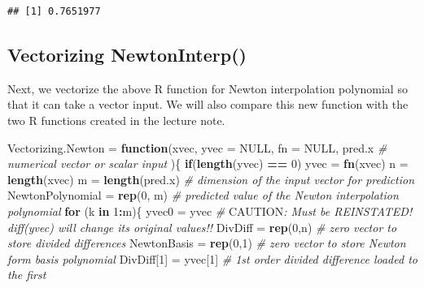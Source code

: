\documentclass[
]{book}
\newenvironment{Shaded}{\begin{snugshade}}{\end{snugshade}}
\newcommand{\AlertTok}[1]{\textcolor[rgb]{0.94,0.16,0.16}{#1}}
\newcommand{\AttributeTok}[1]{\textcolor[rgb]{0.13,0.29,0.53}{#1}}
\newcommand{\CommentTok}[1]{\textcolor[rgb]{0.56,0.35,0.01}{\textit{#1}}}
\newcommand{\ConstantTok}[1]{\textcolor[rgb]{0.56,0.35,0.01}{#1}}
\newcommand{\ControlFlowTok}[1]{\textcolor[rgb]{0.13,0.29,0.53}{\textbf{#1}}}
\newcommand{\DecValTok}[1]{\textcolor[rgb]{0.00,0.00,0.81}{#1}}
\newcommand{\FunctionTok}[1]{\textcolor[rgb]{0.13,0.29,0.53}{\textbf{#1}}}
\newcommand{\NormalTok}[1]{#1}
\newcommand{\OtherTok}[1]{\textcolor[rgb]{0.56,0.35,0.01}{#1}}
\newcommand{\SpecialCharTok}[1]{\textcolor[rgb]{0.81,0.36,0.00}{\textbf{#1}}}
\begin{document}
\begin{verbatim}
## [1] 0.7651977
\end{verbatim}

\hypertarget{vectorizing-newtoninterp}{%
\subsection{\texorpdfstring{Vectorizing \textbf{NewtonInterp()}}{Vectorizing NewtonInterp()}}\label{vectorizing-newtoninterp}}

Next, we vectorize the above R function for Newton interpolation polynomial so that it can take a vector input. We will also compare this new function with the two R functions created in the lecture note.

\begin{Shaded}
\begin{Highlighting}[]
\NormalTok{Vectorizing.Newton }\OtherTok{=} \ControlFlowTok{function}\NormalTok{(xvec, }
                                \AttributeTok{yvec =} \ConstantTok{NULL}\NormalTok{, }
                                \AttributeTok{fn =} \ConstantTok{NULL}\NormalTok{,}
\NormalTok{                                pred.x     }\CommentTok{\# numerical vector or scalar input}
\NormalTok{                        )\{}
 \ControlFlowTok{if}\NormalTok{(}\FunctionTok{length}\NormalTok{(yvec) }\SpecialCharTok{==} \DecValTok{0}\NormalTok{) yvec }\OtherTok{=} \FunctionTok{fn}\NormalTok{(xvec)}
\NormalTok{ n }\OtherTok{=} \FunctionTok{length}\NormalTok{(xvec)  }
\NormalTok{ m }\OtherTok{=} \FunctionTok{length}\NormalTok{(pred.x)            }\CommentTok{\# dimension of the input vector for prediction}
\NormalTok{ NewtonPolynomial }\OtherTok{=} \FunctionTok{rep}\NormalTok{(}\DecValTok{0}\NormalTok{, m)  }\CommentTok{\# predicted value of the Newton interpolation polynomial}
 \ControlFlowTok{for}\NormalTok{ (k }\ControlFlowTok{in} \DecValTok{1}\SpecialCharTok{:}\NormalTok{m)\{}
\NormalTok{    yvec0 }\OtherTok{=}\NormalTok{ yvec     }\CommentTok{\# }\AlertTok{CAUTION}\CommentTok{: Must be REINSTATED! diff(yvec) will change its original values!! }
\NormalTok{    DivDiff }\OtherTok{=} \FunctionTok{rep}\NormalTok{(}\DecValTok{0}\NormalTok{,n)         }\CommentTok{\# zero vector to store divided differences}
\NormalTok{    NewtonBasis }\OtherTok{=} \FunctionTok{rep}\NormalTok{(}\DecValTok{0}\NormalTok{,}\DecValTok{1}\NormalTok{)     }\CommentTok{\# zero vector to store Newton form basis polynomial }
\NormalTok{    DivDiff[}\DecValTok{1}\NormalTok{] }\OtherTok{=}\NormalTok{ yvec[}\DecValTok{1}\NormalTok{]       }\CommentTok{\# 1st order divided difference loaded to the first}

\end{Highlighting}
\end{Shaded}
\end{document}

